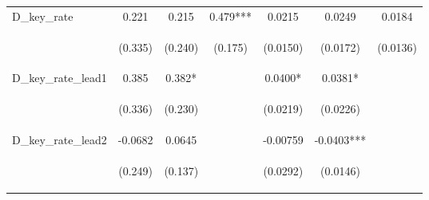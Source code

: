 \documentclass[]{article}
\begin{document}
\begin{center}
\begin{tabular}{lcccccc}
D\_key\_rate & 0.221 & 0.215 & 0.479*** & 0.0215 & 0.0249 & 0.0184 \\
\vspace{4pt} & \begin{footnotesize}(0.335)\end{footnotesize} & \begin{footnotesize}(0.240)\end{footnotesize} & \begin{footnotesize}(0.175)\end{footnotesize} & \begin{footnotesize}(0.0150)\end{footnotesize} & \begin{footnotesize}(0.0172)\end{footnotesize} & \begin{footnotesize}(0.0136)\end{footnotesize} \\
D\_key\_rate\_lead1 & 0.385 & 0.382* &  & 0.0400* & 0.0381* &  \\
\vspace{4pt} & \begin{footnotesize}(0.336)\end{footnotesize} & \begin{footnotesize}(0.230)\end{footnotesize} & \begin{footnotesize}\end{footnotesize} & \begin{footnotesize}(0.0219)\end{footnotesize} & \begin{footnotesize}(0.0226)\end{footnotesize} & \begin{footnotesize}\end{footnotesize} \\
D\_key\_rate\_lead2 & -0.0682 & 0.0645 &  & -0.00759 & -0.0403*** &  \\
\vspace{4pt} & \begin{footnotesize}(0.249)\end{footnotesize} & \begin{footnotesize}(0.137)\end{footnotesize} & \begin{footnotesize}\end{footnotesize} & \begin{footnotesize}(0.0292)\end{footnotesize} & \begin{footnotesize}(0.0146)\end{footnotesize} & \begin{footnotesize}\end{footnotesize} \\

\end{tabular}
\end{center}
\end{document}
